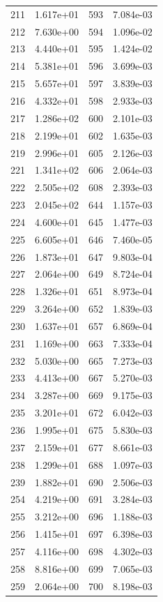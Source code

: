 \documentclass[12pt]{article}
\begin{document}
\begin{longtable}{@{}cccc@{}}
211 & 1.617e+01 & 593 & 7.084e-03 \\
212 & 7.630e+00 & 594 & 1.096e-02 \\
213 & 4.440e+01 & 595 & 1.424e-02 \\
214 & 5.381e+01 & 596 & 3.699e-03 \\
215 & 5.657e+01 & 597 & 3.839e-03 \\
216 & 4.332e+01 & 598 & 2.933e-03 \\
217 & 1.286e+02 & 600 & 2.101e-03 \\
218 & 2.199e+01 & 602 & 1.635e-03 \\
219 & 2.996e+01 & 605 & 2.126e-03 \\
221 & 1.341e+02 & 606 & 2.064e-03 \\
222 & 2.505e+02 & 608 & 2.393e-03 \\
223 & 2.045e+02 & 644 & 1.157e-03 \\
224 & 4.600e+01 & 645 & 1.477e-03 \\
225 & 6.605e+01 & 646 & 7.460e-05 \\
226 & 1.873e+01 & 647 & 9.803e-04 \\
227 & 2.064e+00 & 649 & 8.724e-04 \\
228 & 1.326e+01 & 651 & 8.973e-04 \\
229 & 3.264e+00 & 652 & 1.839e-03 \\
230 & 1.637e+01 & 657 & 6.869e-04 \\
231 & 1.169e+00 & 663 & 7.333e-04 \\
232 & 5.030e+00 & 665 & 7.273e-03 \\
233 & 4.413e+00 & 667 & 5.270e-03 \\
234 & 3.287e+00 & 669 & 9.175e-03 \\
235 & 3.201e+01 & 672 & 6.042e-03 \\
236 & 1.995e+01 & 675 & 5.830e-03 \\
237 & 2.159e+01 & 677 & 8.661e-03 \\
238 & 1.299e+01 & 688 & 1.097e-03 \\
239 & 1.882e+01 & 690 & 2.506e-03 \\
254 & 4.219e+00 & 691 & 3.284e-03 \\
255 & 3.212e+00 & 696 & 1.188e-03 \\
256 & 1.415e+01 & 697 & 6.398e-03 \\
257 & 4.116e+00 & 698 & 4.302e-03 \\
258 & 8.816e+00 & 699 & 7.065e-03 \\
259 & 2.064e+00 & 700 & 8.198e-03 \\

\end{longtable}
\end{document}

